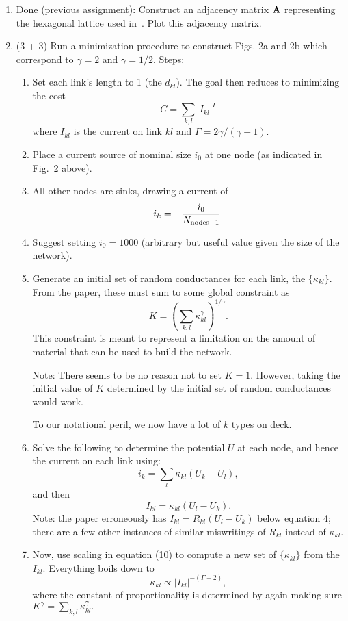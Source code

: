 \begin{enumerate}
  \begin{enumerate}
  \item Done (previous assignment):    
    Construct an adjacency matrix $\mathbf{A}$ representing the hexagonal lattice
    used in~\cite{bohn2007a}.  Plot this adjacency matrix.
  \item (3 + 3)
    Run a minimization procedure to construct Figs. 2a and 2b which
    correspond to $\gamma=2$ and $\gamma=1/2$.
    Steps:
    \begin{enumerate}
    \item 
      Set each link's length to 1 (the $d_{kl}$).
      The goal then reduces to minimizing the cost
      $$
      C 
      = 
      \sum_{k,l} 
      \left| 
      I_{kl}
      \right|^{\Gamma}
      $$
      where $I_{kl}$ is the current on link $kl$
      and $\Gamma = 2\gamma/(\gamma+1)$.
    \item
      Place
      a current source of nominal size $i_0$ at one node
      (as indicated in Fig.~2 above).
    \item 
      All other nodes are sinks, drawing a current of 
      $$
      i_{k} = 
      - \frac{i_{0}}
      {N_{\textnormal{nodes} - 1}}.
      $$
    \item 
      Suggest setting $i_0 = 1000$ (arbitrary but useful value given the size of the
      network).
    \item 
      Generate an initial set of random conductances for each link,
      the $\{\kappa_{kl}\}$.
      From the paper, these must sum to some global constraint as
      $$
      K
      =
      \left(
      \sum_{k,l}
      \kappa_{kl}^{\gamma}
      \right)^{1/\gamma}.
      $$
      This constraint is meant to represent a limitation on the amount of material
      that can be used to build the network.

      Note: There seems to be no reason not to set $K = 1$.
      However, taking the initial value of $K$ determined by
      the initial set of random conductances would work.

      To our notational peril, we now have a lot of $k$ types on deck.
    \item 
      Solve the following to determine the potential $U$ at each node,
      and hence the current on each link using:
      $$
      i_{k}
      =
      \sum_{l}
      \kappa_{kl}(U_{k}-U_{l}),
      $$
      and then
      $$
      I_{kl} = \kappa_{kl}(U_{l} - U_{k}).
      $$
      Note: the paper erroneously has $I_{kl} = R_{kl}(U_{l} - U_{k})$ below
      equation 4; there are a few other instances of similar
      miswritings of $R_{kl}$ instead of $\kappa_{kl}$.
    \item 
      Now, use scaling in equation (10) to compute a new set of $\{\kappa_{kl}\}$
      from the $I_{kl}$.  Everything boils down to 
      $$
      \kappa_{kl} \propto | I_{kl} |^{-(\Gamma-2)},
      $$
      where the constant of proportionality is determined
      by again making sure 
      $
      K^{\gamma}
      =
      \sum_{k,l}
      \kappa_{kl}^{\gamma}.
      $
    \end{enumerate}


\end{enumerate}
\end{enumerate}
